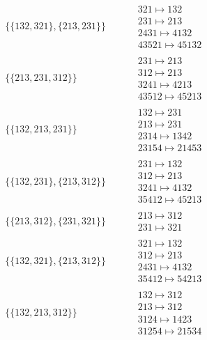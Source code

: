 \begin{tiny}
\begin{align}
\begin{matrix}
\end{matrix}
\\
\{\{132, 321\}, \{213, 231\}\}
\quad
&
\phantom{.}
&
\begin{matrix}
321 \mapsto 132\\231 \mapsto 213\\2431 \mapsto 4132\\43521 \mapsto 45132
\end{matrix}
\\
\{\{213, 231, 312\}\}
\quad
&
\phantom{.}
&
\begin{matrix}
231 \mapsto 213\\312 \mapsto 213\\3241 \mapsto 4213\\43512 \mapsto 45213
\end{matrix}
\\
\{\{132, 213, 231\}\}
\quad
&
\phantom{.}
&
\begin{matrix}
132 \mapsto 231\\213 \mapsto 231\\2314 \mapsto 1342\\23154 \mapsto 21453
\end{matrix}
\\
\{\{132, 231\}, \{213, 312\}\}
\quad
&
\phantom{.}
&
\begin{matrix}
231 \mapsto 132\\312 \mapsto 213\\3241 \mapsto 4132\\35412 \mapsto 45213
\end{matrix}
\\
\{\{213, 312\}, \{231, 321\}\}
\quad
&
\phantom{.}
&
\begin{matrix}
213 \mapsto 312\\231 \mapsto 321
\end{matrix}
\\
\{\{132, 321\}, \{213, 312\}\}
\quad
&
\phantom{.}
&
\begin{matrix}
321 \mapsto 132\\312 \mapsto 213\\2431 \mapsto 4132\\35412 \mapsto 54213
\end{matrix}
\\
\{\{132, 213, 312\}\}
\quad
&
\phantom{.}
&
\begin{matrix}
132 \mapsto 312\\213 \mapsto 312\\3124 \mapsto 1423\\31254 \mapsto 21534

\end{matrix}
\end{align}
\end{tiny}
